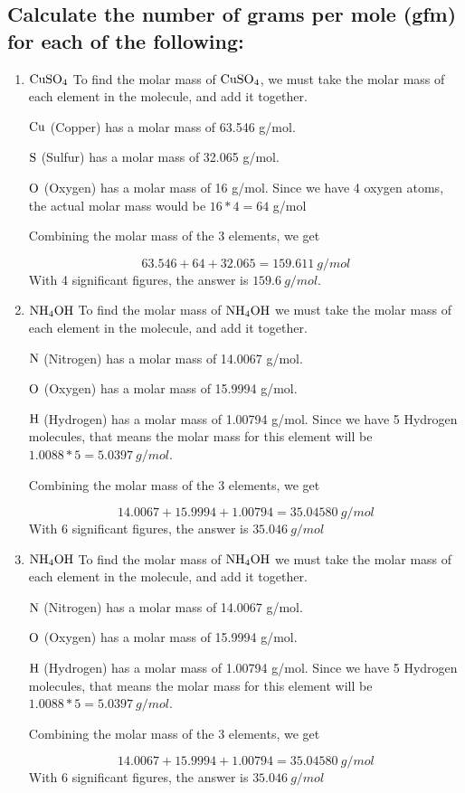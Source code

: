 \documentclass[11pt]{article}
\begin{document}
\subsection{Calculate the number of grams per mole (gfm) for each of the following:}
\label{sec:orge9f22e8}
\begin{enumerate}
\item \(\ce{CuSO4}\)
To find the molar mass of \(\ce{CuSO4}\), we must take the molar mass of
each element in the molecule, and add it together.

\(\ce{Cu}\) (Copper) has a molar mass of 63.546 g/mol.

\(\ce{S}\) (Sulfur) has a molar mass of 32.065 g/mol.

\(\ce{O}\) (Oxygen) has a molar mass of 16 g/mol. Since we have 4 oxygen
atoms, the actual molar mass would be \(16*4=64\) g/mol

Combining the molar mass of the 3 elements, we get

\begin{equation}
63.546+64+32.065=159.611\ g/mol
\end{equation}
With 4 significant figures, the answer is \textbf{\(159.6\ g/mol\)}.

\item \(\ce{NH4OH}\)
To find the molar mass of \(\ce{NH4OH}\) we must take the molar mass of each element in the molecule, and add it together.

\(\ce{N}\) (Nitrogen) has a molar mass of 14.0067 g/mol.

\(\ce{O}\) (Oxygen) has a molar mass of 15.9994 g/mol.

\(\ce{H}\) (Hydrogen) has a molar mass of 1.00794 g/mol. Since we have 5
Hydrogen molecules, that means the molar mass for this element will be
\(1.0088*5=5.0397\ g/mol\).

Combining the molar mass of the 3 elements, we get

\begin{equation}
14.0067+15.9994+1.00794=35.04580\ g/mol
\end{equation}
With 6 significant figures, the answer is \textbf{\(35.046\ g/mol\)}

\item \(\ce{NH4OH}\)
To find the molar mass of \(\ce{NH4OH}\) we must take the molar mass of each element in the molecule, and add it together.

\(\ce{N}\) (Nitrogen) has a molar mass of 14.0067 g/mol.

\(\ce{O}\) (Oxygen) has a molar mass of 15.9994 g/mol.

\(\ce{H}\) (Hydrogen) has a molar mass of 1.00794 g/mol. Since we have 5
Hydrogen molecules, that means the molar mass for this element will be
\(1.0088*5=5.0397\ g/mol\).

Combining the molar mass of the 3 elements, we get

\begin{equation}
14.0067+15.9994+1.00794=35.04580\ g/mol
\end{equation}
With 6 significant figures, the answer is \textbf{\(35.046\ g/mol\)}
\end{enumerate}
\end{document}
